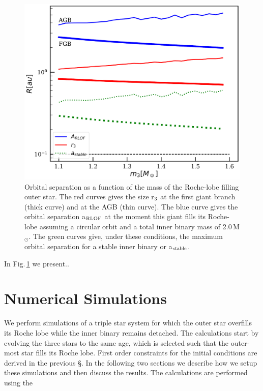 \documentclass{aastex62}
\newcommand{\MSun}{\mbox{M$_\odot$}}
\begin{document}
\begin{figure}[ht!]
  \includegraphics[width=\columnwidth]{fig_minimumstablesize.pdf}
\caption{Orbital separation as a function of the mass of the
  Roche-lobe filling outer star. The red curves gives the size r$_{\rm 3}$ at the
  first giant branch (thick curve) and at the AGB (thin curve). The
  blue curve gives the orbital separation a$_{\rm RLOF}$ at the moment this giant fills its
  Roche-lobe assuming a circular orbit and a total inner binary mass
  of 2.0\,\MSun. The green curves give, under these conditions, the
  maximum orbital separation for a stable inner binary or a$_{\rm stable}$.
\label{fig:tertiarymass_vs_size}}
\end{figure}

In Fig.\,\ref{fig:tertiarymass_vs_size} we present..

\section{Numerical Simulations} \label{sims}

We perform simulations of a triple star system for which the outer
star overfills its Roche lobe while the inner binary remains
detached. The calculations start by evolving the three stars to the
same age, which is selected such that the outer-most star fills its
Roche lobe.  First order constraints for the initial conditions are
derived in the previous \S. In the following two sections we describe
how we setup these simulations and then discuss the results. The
calculations are performed using the
\end{document}
